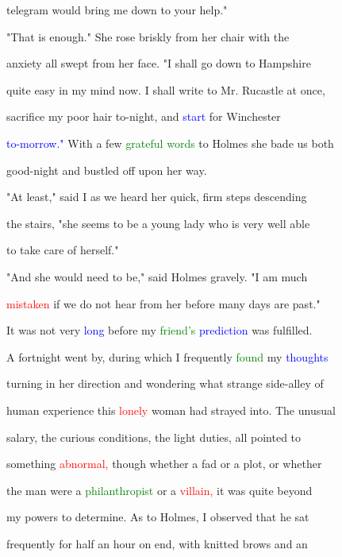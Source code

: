  telegram would bring me down to your help."



 "That is enough." She rose briskly from her chair with the

 \textcolor{BurntOrange}{anxiety} all swept from her face. "I shall go down to Hampshire

 quite easy in my mind now. I shall write to Mr. Rucastle at once,

 sacrifice my poor hair to-night, and \textcolor{blue}{start} for Winchester

 \textcolor{blue}{to-morrow."} With a few \textcolor{green}{grateful} \textcolor{green}{words} to Holmes she bade us both

 good-night and bustled off upon her way.



 "At least," said I as we heard her quick, firm steps descending

 the stairs, "she seems to be a \textcolor{BurntOrange}{young} lady who is very well able

 to take care of herself."



 "And she would need to be," said Holmes gravely. "I am much

 \textcolor{red}{mistaken} if we do not hear from her before many days are past."



 It was not very \textcolor{blue}{long} before my \textcolor{green}{friend's} \textcolor{blue}{prediction} was fulfilled.

 A fortnight went by, during which I frequently \textcolor{green}{found} my \textcolor{blue}{thoughts}

 turning in her direction and wondering what strange side-alley of

 human experience this \textcolor{red}{lonely} woman had strayed into. The unusual

 \textcolor{BurntOrange}{salary,} the curious conditions, the light duties, all pointed to

 something \textcolor{red}{abnormal,} though whether a fad or a plot, or whether

 the man were a \textcolor{green}{philanthropist} or a \textcolor{red}{villain,} it was quite beyond

 my powers to determine. As to Holmes, I observed that he sat

 frequently for half an hour on end, with knitted brows and an

